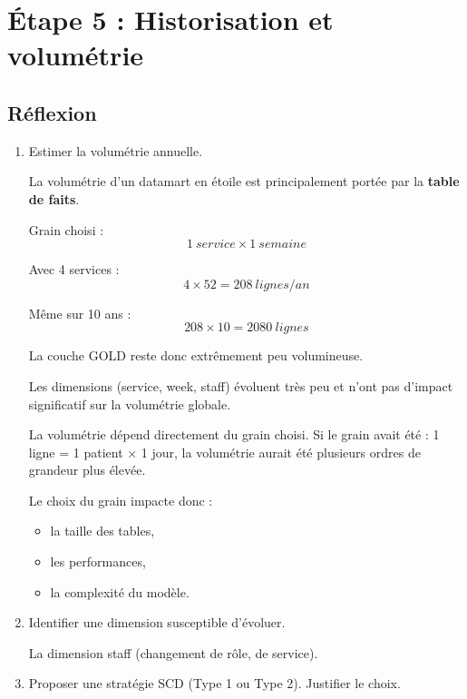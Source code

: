 \documentclass[11pt,a4paper]{article}
\begin{document}

\section{Étape 5 : Historisation et volumétrie}

\subsection*{Réflexion}

\begin{enumerate}
  \item Estimer la volumétrie annuelle.
    \begin{tcolorbox}[title=\textbf{Volumétrie estimée :}, colback=gray!5, colframe=black, boxrule=0.8pt, arc=2mm]

    La volumétrie d’un datamart en étoile est principalement portée par la
    \textbf{table de faits}.

    Grain choisi :
    \[
    1\ service \times 1\ semaine
    \]

    Avec 4 services :
    \[
    4 \times 52 = 208\ lignes/an
    \]

    Même sur 10 ans :
    \[
    208 \times 10 = 2080\ lignes
    \]

    La couche GOLD reste donc extrêmement peu volumineuse.

    Les dimensions (service, week, staff) évoluent très peu
    et n’ont pas d’impact significatif sur la volumétrie globale.
    \end{tcolorbox}

    \begin{tcolorbox}[colback=blue!5, colframe=blue!60, title=\textbf{Commentaire enseignant}]
    La volumétrie dépend directement du grain choisi.
    Si le grain avait été :
    1 ligne = 1 patient × 1 jour,
    la volumétrie aurait été plusieurs ordres de grandeur plus élevée.

    Le choix du grain impacte donc :
    \begin{itemize}
    \item la taille des tables,
    \item les performances,
    \item la complexité du modèle.
    \end{itemize}
    \end{tcolorbox}

  \item Identifier une dimension susceptible d’évoluer.
    \begin{tcolorbox}[title=\textbf{Dimension susceptible d’évoluer :}, colback=gray!5, colframe=black, boxrule=0.8pt, arc=2mm]
    La dimension staff (changement de rôle, de service).
    \end{tcolorbox}
  \item Proposer une stratégie SCD (Type 1 ou Type 2). Justifier le choix.
    \begin{tcolorbox}[title=\textbf{Stratégie SCD proposée et justification :}, colback=gray!5, colframe=black, boxrule=0.8pt, arc=2mm]


\end{tcolorbox}
\end{enumerate}
\end{document}

